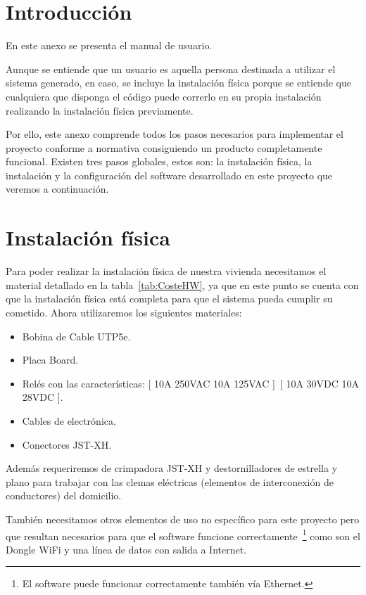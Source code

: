 
\section{Introducción}
En este anexo se presenta el manual de usuario.

Aunque se entiende que un usuario es aquella persona destinada a utilizar el sistema generado, en caso, se incluye la instalación física porque se entiende que cualquiera que disponga el código puede correrlo en su propia instalación realizando la instalación física previamente.

Por ello, este anexo comprende todos los pasos necesarios para implementar el proyecto conforme a normativa consiguiendo un producto completamente funcional. Existen tres pasos globales, estos son: la instalación física, la instalación y la configuración del software desarrollado en este proyecto que veremos a continuación.

\section{Instalación física}
Para poder realizar la instalación física de nuestra vivienda necesitamos el material detallado en la tabla~\ref{tab:CosteHW}, ya que en este punto se cuenta con que la instalación física está completa para que el sistema pueda cumplir su cometido. Ahora utilizaremos los siguientes materiales:
\begin{itemize}
    \item Bobina de Cable UTP5e.
    \item Placa Board.
    \item Relés con las características: [ 10A 250VAC 10A 125VAC ]~[ 10A 30VDC 10A 28VDC ].
    \item Cables de electrónica.
    \item Conectores JST-XH.
\end{itemize}

Además requeriremos de crimpadora JST-XH y destornilladores de estrella y plano para trabajar con las clemas eléctricas (elementos de interconexión de conductores) del domicilio.

También necesitamos otros elementos de uso no específico para este proyecto pero que resultan necesarios para que el software funcione correctamente~\footnote{El software puede funcionar correctamente también vía Ethernet.} como son el Dongle WiFi y una línea de datos con salida a Internet.

